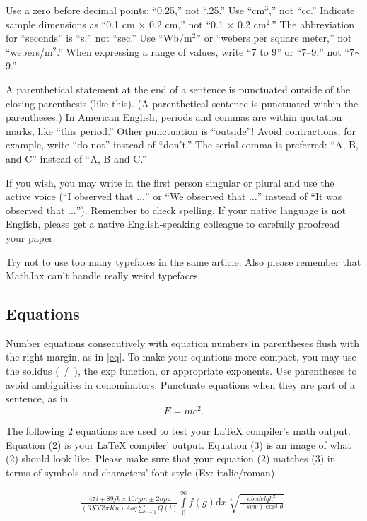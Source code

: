 \documentclass{ieeeaccess}
\begin{document}
Use a zero before decimal points: ``0.25,'' not ``.25.'' Use
``cm$^{3}$,'' not ``cc.'' Indicate sample dimensions as ``0.1 cm
$\times $ 0.2 cm,'' not ``0.1 $\times $ 0.2 cm$^{2}$.'' The
abbreviation for ``seconds'' is ``s,'' not ``sec.'' Use
``Wb/m$^{2}$'' or ``webers per square meter,'' not
``webers/m$^{2}$.'' When expressing a range of values, write ``7 to
9'' or ``7--9,'' not ``7$\sim $9.''

A parenthetical statement at the end of a sentence is punctuated outside of
the closing parenthesis (like this). (A parenthetical sentence is punctuated
within the parentheses.) In American English, periods and commas are within
quotation marks, like ``this period.'' Other punctuation is ``outside''!
Avoid contractions; for example, write ``do not'' instead of ``don't.'' The
serial comma is preferred: ``A, B, and C'' instead of ``A, B and C.''

If you wish, you may write in the first person singular or plural and use
the active voice (``I observed that $\ldots$'' or ``We observed that $\ldots$''
instead of ``It was observed that $\ldots$''). Remember to check spelling. If
your native language is not English, please get a native English-speaking
colleague to carefully proofread your paper.

Try not to use too many typefaces in the same article. Also please remember that MathJax
can't handle really weird typefaces.

\subsection{Equations}
Number equations consecutively with equation numbers in parentheses flush
with the right margin, as in \eqref{eq}. To make your equations more
compact, you may use the solidus (~/~), the exp function, or appropriate
exponents. Use parentheses to avoid ambiguities in denominators. Punctuate
equations when they are part of a sentence, as in
\begin{equation}E=mc^2.\label{eq}\end{equation}

The following 2 equations are used to test 
your LaTeX compiler's math output. Equation (2) is your LaTeX compiler' output. Equation (3) is an image of what (2) should look like.
Please make sure that your equation (2) matches (3) in terms of symbols and characters' font style (Ex: italic/roman).

\begin{align*} \frac{47i+89jk\times 10rym \pm 2npz }{(6XYZ\pi Ku) Aoq \sum _{i=1}^{r} Q(t)} {\int\limits_0^\infty \! f(g)\mathrm{d}x}  \sqrt[3]{\frac{abcdelqh^2}{ (svw) \cos^3\theta }} . \tag{2}\end{align*}
\end{document}
